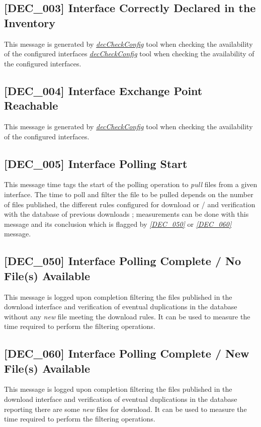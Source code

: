 \documentclass[dec_sum_main.tex]{subfiles}
\begin{document}
\label{DEC003}
\subsection{[DEC\_003] Interface Correctly Declared in the Inventory}
This message is generated by \hyperref[decCheckConfig]{\textit{decCheckConfig}} tool when checking the availability of the configured interfaces \hyperref[decCheckConfig]{\textit{decCheckConfig}} tool when checking the availability of the configured interfaces.

\label{DEC004}
\subsection{[DEC\_004] Interface Exchange Point Reachable}
This message is generated by \hyperref[decCheckConfig]{\textit{decCheckConfig}} tool when checking the availability of the configured interfaces.

\label{DEC005}
\subsection{[DEC\_005] Interface Polling Start}
This message time tags the start of the polling operation to \textit{pull} files from a given interface. The time to poll and filter the file to be pulled depends on the number of files published, the different rules configured for download or / and verification with the database of previous downloads ; measurements can be done with this message and its conclusion which is flagged by \hyperref[DEC050]{\textit{[DEC\_050]}} or \hyperref[DEC060]{\textit{[DEC\_060]}} message.

\label{DEC050}
\subsection{[DEC\_050] Interface Polling Complete / No File(s) Available}
This message is logged upon completion filtering the files published in the download interface and verification of eventual duplications in the database without any \textit{new} file meeting the download rules. It can be used to measure the time required to perform the filtering operations.

\label{DEC060}
\subsection{[DEC\_060] Interface Polling Complete / New File(s) Available}
This message is logged upon completion filtering the files published in the download interface and verification of eventual duplications in the database reporting there are some \textit{new} files for download. It can be used to measure the time required to perform the filtering operations.
\end{document}
